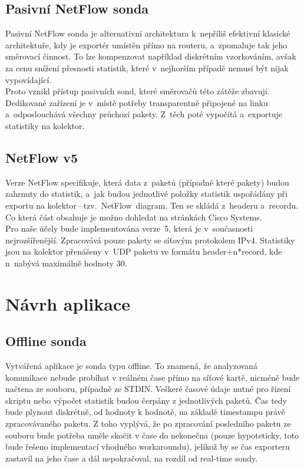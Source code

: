 \documentclass[12pt,a4paper,titlepage]{extarticle}
\begin{document}
\subsection{Pasivní NetFlow sonda}
Pasivní NetFlow sonda je alternativní architektura k~nepříliš efektivní klasické architektuře, kdy je exportér umístěn přímo na routeru, a~zpomaluje tak jeho směrovací činnost. To lze kompenzovat například diskrétním vzorkováním, avšak za cenu snížení přesnosti statistik, které v~nejhorším případě nemusí být nijak vypovídající.
\\Proto vznikl přístup pasivních sond, které směrovačů této zátěže zbavují. Dedikované zařízení je v~místě potřeby transparentně připojené na linku a~odposlouchává všechny průchozí pakety. Z~těch poté vypočítá a~exportuje statistiky na kolektor.

\subsection{NetFlow v5}
Verze NetFlow specifikuje, která data z~paketů (případně které pakety) budou zahrnuty do statistik, a~jak budou jednotlivé položky statistik uspořádány při exportu na kolektor\,--\,tzv.~NetFlow~diagram. Ten se skládá z~headeru a~recordu. Co která část obsahuje je možno dohledat na stránkách Cisco Systems.
\\Pro naše účely bude implementována verze~5, která je v~současnosti nejrozšířenější. Zpracovává pouze pakety se síťovým protokolem IPv4. Statistiky jsou na kolektor přenášeny v~UDP paketu ve formátu header+n*record, kde n~nabývá maximálně hodnoty 30.

\pagebreak

\section{Návrh aplikace}

\subsection{Offline sonda}
Vytvářená aplikace je sonda typu offline. To znamená, že analyzovaná komunikace nebude probíhat v reálném čase přímo na síťové kartě, nicméně bude načtena ze souboru, případně ze STDIN. Veškeré časové údaje nutné pro řízení skriptu nebo výpočet statistik budou čerpány z jednotlivých paketů. Čas tedy bude plynout diskrétně, od hodnoty k hodnotě, na základě timestampu právě zpracovávaného paketu. Z toho vyplývá, že po zpracování posledního paketu ze souboru bude potřeba uměle skočit v čase do nekonečna (pouze hypoteticky, toto bude řešeno implementací vhodného workaroundu), jelikož by se čas exporteru zastavil na jeho čase a dál nepokračoval, na rozdíl od real-time sondy.
\end{document}
